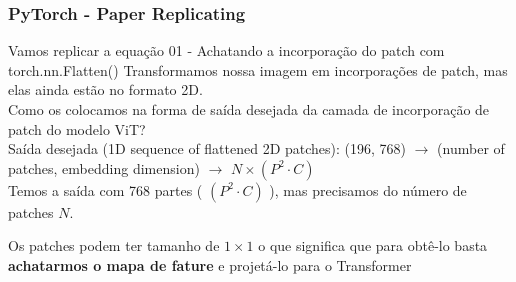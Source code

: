 \documentclass{beamer}
\begin{document}
\begin{frame}
	\frametitle{PyTorch - Paper Replicating}
	\begin{block}{Vamos replicar a equação 01 - Achatando a incorporação do patch com torch.nn.Flatten()}
		Transformamos nossa imagem em incorporações de patch, mas elas ainda estão no formato 2D. \\
		Como os colocamos na forma de saída desejada da camada de incorporação de patch do modelo ViT? \\
		Saída desejada (1D sequence of flattened 2D patches): (196, 768) $\rightarrow$ (number of patches, embedding dimension) $\rightarrow$ ${N \times\left(P^{2} \cdot C\right)}$ \\
		Temos a saída com 768 partes  ( $(P^{2} \cdot C)$ ), mas precisamos do número de patches $N$.
		
		\alert{Os patches podem ter tamanho de $1 \times 1$ o que significa que para obtê-lo basta \textbf{achatarmos o mapa de fature} e projetá-lo para o Transformer}
		
		
	\end{block}
\end{frame}
\end{document}
